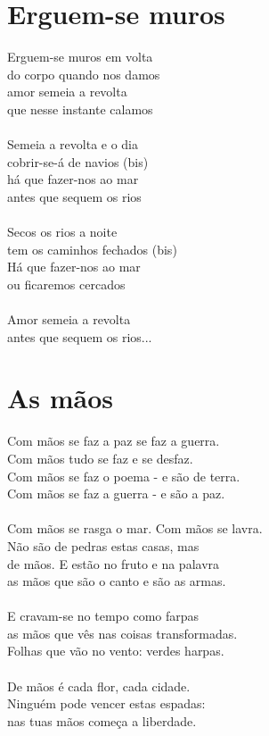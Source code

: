 \documentclass{article}
\begin{document}
\section{ Erguem-se muros}
Erguem-se muros em volta\\
do corpo quando nos damos\\
amor semeia a revolta\\
que nesse instante calamos\\
\\
Semeia a revolta e o dia \\
cobrir-se-á de navios (bis)\\
há que fazer-nos ao mar\\
antes que sequem os rios\\
\\
Secos os rios a noite\\
tem os caminhos fechados (bis)\\
Há que fazer-nos ao mar\\
ou ficaremos cercados\\
\\
Amor semeia a revolta\\
antes que sequem os rios...\\
\section{ As mãos}
Com mãos se faz a paz se faz a guerra.\\
Com mãos tudo se faz e se desfaz.\\
Com mãos se faz o poema - e são de terra.\\
Com mãos se faz a guerra - e são a paz.\\
\\
Com mãos se rasga o mar. Com mãos se lavra.\\
Não são de pedras estas casas, mas\\
de mãos. E estão no fruto e na palavra\\
as mãos que são o canto e são as armas.\\
\\
E cravam-se no tempo como farpas\\
as mãos que vês nas coisas transformadas.\\
Folhas que vão no vento: verdes harpas.\\
\\
De mãos é cada flor, cada cidade.\\
Ninguém pode vencer estas espadas:\\
nas tuas mãos começa a liberdade.\\
\\
\end{document}
